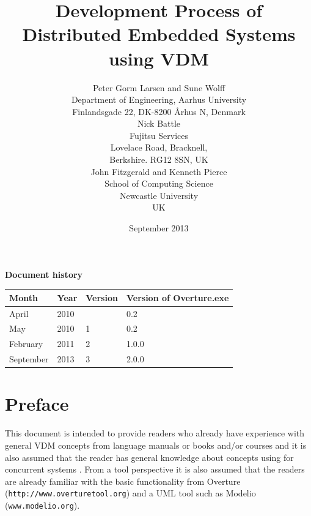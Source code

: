 \documentclass{overturerepchap}
\newcommand{\VDMTools}{VDMTools}
\newcommand{\url}[1]{\texttt{#1}}
\begin{document}
\title{Development Process of Distributed Embedded Systems using VDM}
\author{Peter Gorm Larsen and Sune Wolff \\ 
Department of Engineering, Aarhus University\\
Finlandsgade 22, DK-8200 \AA{}rhus N, Denmark\\[3mm]
Nick Battle\\
Fujitsu Services\\
Lovelace Road, Bracknell, \\
Berkshire. RG12 8SN, UK\\[3mm]
John Fitzgerald and Kenneth Pierce\\
School of Computing Science\\
Newcastle University\\
UK
}
\date{September 2013}


\maketitle


{\textbf{Document history}}

\begin{tabular}{|l|l|l|l|}\hline
Month   & Year & Version & Version of Overture.exe \\ \hline
April   & 2010 &   & 0.2   \\ \hline
May     & 2010 & 1 & 0.2 \\ \hline
February& 2011 & 2 & 1.0.0\\ \hline
September& 2013 & 3 & 2.0.0\\ \hline
\end{tabular}

\tableofcontents

\chapter*{Preface}

This document is intended to provide readers who already have
experience with general VDM concepts from language manuals
\cite{LangManPP} or books \cite{Fitzgerald&05} and/or courses and it
is also assumed that the reader has general knowledge about concepts
using for concurrent systems
\cite{Ben-Ari82,Hoare85,Chandy&88,Milner89,Lea99}. From a tool perspective
it is also assumed that the readers are already familiar with the
basic functionality from Overture (\url{http://www.overturetool.org}) 
and a UML tool such as Modelio (\url{www.modelio.org}).
\end{document}
